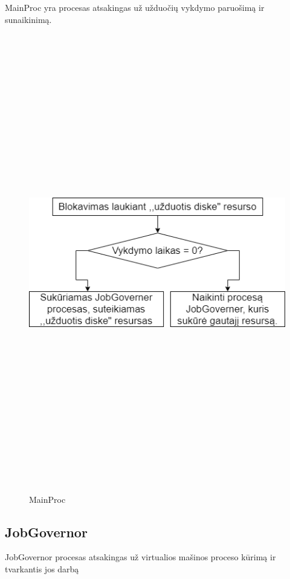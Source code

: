 \documentclass[oneside]{VUMIFPSkursinis}
\begin{document}
MainProc yra procesas atsakingas už užduočių vykdymo paruošimą ir sunaikinimą.
\begin{figure}[H]
		\centering	
	\includegraphics[width=18cm,height=20cm,keepaspectratio]{MainProc.png}
	\caption{MainProc}
	\label{fig:MainProc}
\end{figure}

\subsection{JobGovernor}JobGovernor procesas atsakingas už virtualios mašinos proceso kūrimą ir tvarkantis jos darbą
\end{document}
